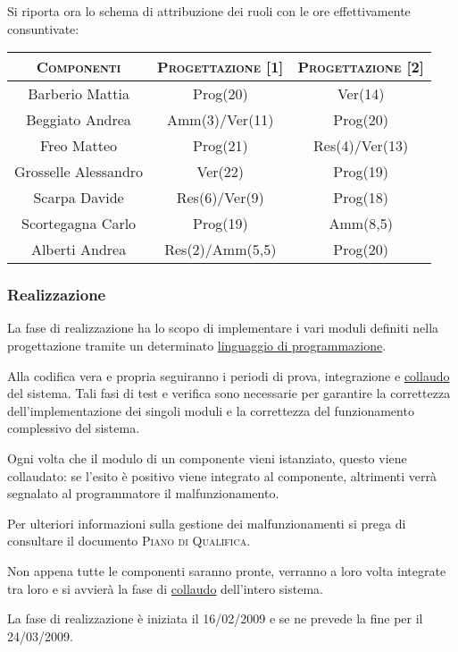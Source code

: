 \documentclass[11pt,a4paper]{article}
\begin{document}
Si riporta ora lo schema di attribuzione dei ruoli con le ore effettivamente consuntivate:
\\
\begin{center}
\begin{tabular}{|c||c|c|}
\hline
\textsc{Componenti} & \textsc{Progettazione [1]} & \textsc{Progettazione [2]} \\ \hline \hline
Barberio Mattia & Prog(20) & Ver(14) \\ \hline
Beggiato Andrea & Amm(3)/Ver(11) & Prog(20) \\ \hline
Freo Matteo & Prog(21) & Res(4)/Ver(13) \\ \hline
Grosselle Alessandro & Ver(22) & Prog(19) \\ \hline
Scarpa Davide & Res(6)/Ver(9) & Prog(18) \\ \hline
Scortegagna Carlo & Prog(19) & Amm(8,5) \\ \hline
Alberti Andrea & Res(2)/Amm(5,5) & Prog(20) \\ \hline
\end{tabular}
\end{center}
\bigskip

\subsubsection{Realizzazione}
La fase di realizzazione ha lo scopo di implementare i vari moduli definiti nella progettazione tramite un determinato \underline{linguaggio di programmazione}.

Alla codifica vera e propria seguiranno i periodi di prova, integrazione e \underline{collaudo} del sistema.
Tali fasi di test e verifica sono necessarie per garantire la correttezza dell'implementazione dei singoli moduli e la correttezza del funzionamento complessivo del sistema.

Ogni volta che il modulo di un componente vieni istanziato, questo viene collaudato: se l'esito è positivo viene integrato al componente, altrimenti verrà segnalato al programmatore il malfunzionamento.

Per ulteriori informazioni sulla gestione dei malfunzionamenti si prega di consultare il documento \textsc{Piano di Qualifica}.

Non appena tutte le componenti saranno pronte, verranno a loro volta integrate tra loro e si avvierà la fase di \underline{collaudo} dell'intero sistema.

La fase di realizzazione è iniziata il 16/02/2009 e se ne prevede la fine per il 24/03/2009.
\end{document}
